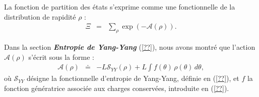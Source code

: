 {\color{blue} 





}

La fonction de partition des états s’exprime comme une fonctionnelle de la distribution de rapidité \( \rho \) :
\begin{eqnarray*}
	\Xi & = & \sum_\rho \exp\left( -\mathcal{A}(\rho) \right).
\end{eqnarray*}

Dans la section \textit{\textbf{Entropie de Yang-Yang}} (\ref{??}), nous avons montré que l’action \( \mathcal{A}(\rho) \) s’écrit sous la forme :
\begin{eqnarray*}
	\mathcal{A}(\rho) & \doteq & - L\mathcal{S}_{YY}(\rho) + L \int f(\theta)\, \rho(\theta) \, d\theta,
\end{eqnarray*}
où \( \mathcal{S}_{YY} \) désigne la fonctionnelle d'entropie de Yang-Yang, définie en (\ref{??}), et \( f \) la fonction génératrice associée aux charges conservées, introduite en (\ref{??}).

{\color{blue} 

}

